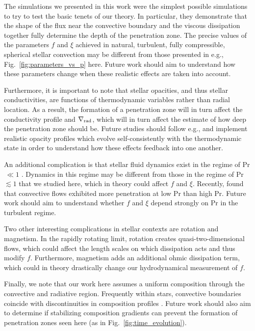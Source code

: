 \documentclass{aastex631}
\newcommand{\gradrad}{\ensuremath{\nabla_{\rm{rad}}}}
\newcommand\Pran{\ensuremath{\mathrm{Pr}}}
\begin{document}
The simulations we presented in this work were the simplest possible simulations to try to test the basic tenets of our theory.
In particular, they demonstrate that the shape of the flux near the convective boundary and the viscous dissipation together fully determine the depth of the penetration zone.
The precise values of the parameters $f$ and $\xi$ achieved in natural, turbulent, fully compressible, spherical stellar convection may be different from those presented in e.g., Fig.~\ref{fig:parameters_vs_p} here.
Future work should aim to understand how these parameters change when these realistic effects are taken into account.

Furthermore, it is important to note that stellar opacities, and thus stellar conductivities, are functions of thermodynamic variables rather than radial location.
As a result, the formation of a penetration zone will in turn affect the conductivity profile and $\gradrad$, which will in turn affect the estimate of how deep the penetration zone should be.
Future studies should follow e.g., \citet{kapyla_etal_2017} and implement realistic opacity profiles which evolve self-consistently with the thermodynamic state in order to understand how these effects feedback into one another.

An additional complication is that stellar fluid dynamics exist in the regime of Pr$\,\ll1$ \citep{garaud2021}.
Dynamics in this regime may be different from those in the regime of Pr $\lesssim 1$ that we studied here, which in theory could affect $f$ and $\xi$.
Recently, \citet{kapyla2021} found that convective flows exhibited more penetration at low Pr than high Pr.
Future work should aim to understand whether $f$ and $\xi$ depend strongly on $\Pran$ in the turbulent regime.

Two other interesting complications in stellar contexts are rotation and magnetism.
In the rapidly rotating limit, rotation creates quasi-two-dimensional flows, which could affect the length scales on which dissipation acts and thus modify $f$.
Furthermore, magnetism adds an additional ohmic dissipation term, which could in theory drastically change our hydrodynamical measurement of $f$.

Finally, we note that our work here assumes a uniform composition through the convective and radiative region.
Frequently within stars, convective boundaries coincide with discontinuities in composition profiles \citep{salaris_cassisi_2017}.
Future work should also aim to determine if stabilizing composition gradients can prevent the formation of penetration zones seen here (as in Fig.~\ref{fig:time_evolution}).
\end{document}
